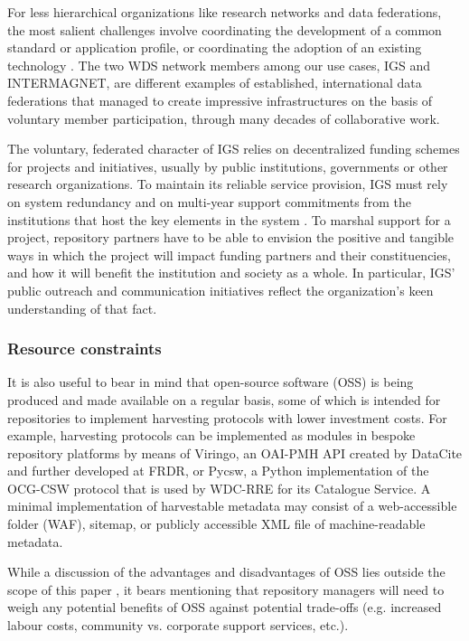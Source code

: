 \documentclass{interact}
\begin{document}
For less hierarchical organizations like research networks and data federations, the most salient challenges involve coordinating the development of a common standard or application profile, or coordinating the adoption of an existing technology \parencite{yarmey_towards_2013}. The two WDS network members among our use cases, IGS and INTERMAGNET, are different examples of established, international data federations that managed to create impressive infrastructures on the basis of voluntary member participation, through many decades of collaborative work. 

The voluntary, federated character of IGS relies on decentralized funding schemes for projects and initiatives, usually by public institutions, governments or other research organizations. To maintain its reliable service provision, IGS must rely on system redundancy and on multi-year support commitments from the institutions that host the key elements in the system \parencite{igs_central_bureau_data_2021-1, villiger_international_2019-1}. To marshal support for a project, repository partners have to be able to envision the positive and tangible ways in which the project will impact funding partners and their constituencies, and how it will benefit the institution and society as a whole. In particular, IGS’ public outreach and communication initiatives reflect the organization’s keen understanding of that fact.

\subsubsection{Resource constraints}
It is also useful to bear in mind that open-source software (OSS) is being produced and made available on a regular basis, some of which is intended for repositories to implement harvesting protocols with lower investment costs. For example, harvesting protocols can be implemented as modules in bespoke repository platforms by means of Viringo, an OAI-PMH API created by DataCite and further developed at FRDR, or Pycsw, a Python implementation of the OCG-CSW protocol that is used by WDC-RRE for its Catalogue Service. A minimal implementation of harvestable metadata may consist of a web-accessible folder (WAF), sitemap, or publicly accessible XML file of machine-readable metadata.

While a discussion of the advantages and disadvantages of OSS lies outside the scope of this paper  \parencite[see][for a discussion of OSS pros and cons]{trappler_is_2009}, it bears mentioning that repository managers will need to weigh any potential benefits of OSS against potential trade-offs (e.g. increased labour costs, community vs. corporate support services, etc.).
\end{document}
